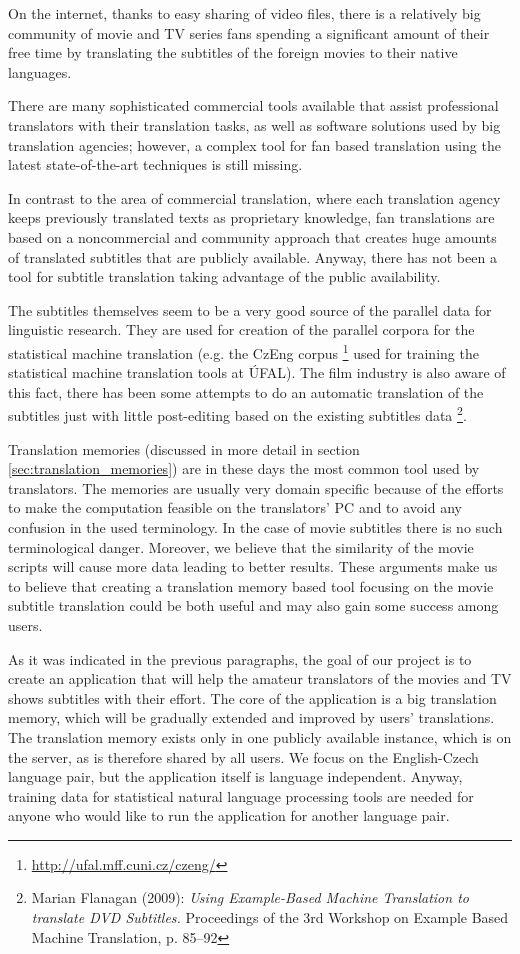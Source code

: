On the internet, thanks to easy sharing of video files, there is a relatively big community of movie and TV series fans spending a significant amount of their free time by translating the subtitles of the foreign movies to their native languages. 


There are many sophisticated commercial tools available that assist professional translators with their translation tasks, as well as software solutions used by big translation agencies; however, a complex tool for fan based translation using the latest state-of-the-art techniques is still missing. 

In contrast to the area of commercial translation, where each translation agency keeps previously translated texts as proprietary knowledge, fan translations are based on a noncommercial and  community approach that creates huge amounts of translated subtitles that are publicly available. Anyway, there has not been a tool for subtitle translation taking advantage of the public availability.

The subtitles themselves seem to be a very good source of the parallel data for linguistic research. They are used for creation of the parallel corpora for the statistical machine translation (e.g. the CzEng corpus \footnote{\url{http://ufal.mff.cuni.cz/czeng/}} used for training the statistical machine translation tools at ÚFAL). The film industry is also aware of this fact, there has been some attempts to do an automatic translation of the subtitles just with little post-editing based on the existing subtitles data \footnote{Marian Flanagan (2009): \emph{Using Example-Based Machine Translation to translate DVD Subtitles.} Proceedings of the 3rd Workshop on Example Based Machine Translation, p. 85–92}.

Translation memories (discussed in more detail in section \ref{sec:translation_memories}) are in these days the most common tool used by translators. The memories are usually very domain specific because of the efforts to make the computation feasible on the translators' PC and to avoid any confusion in the used terminology. In the case of movie subtitles there is no such terminological danger. Moreover, we believe that the similarity of the movie scripts will cause more data leading to better results. These arguments make us to believe that creating a translation memory based tool focusing on the movie subtitle translation could be both useful and may also gain some success among users.

As it was indicated in the previous paragraphs, the goal of our project is to create an application that will help the amateur translators of the movies and TV shows subtitles with their effort. The core of the application is a big translation memory, which will be gradually extended and improved by users' translations. The translation memory exists only in one publicly available instance, which is on the server, as is therefore shared by all users. We focus on the English-Czech language pair, but the application itself is language independent. Anyway, training data for statistical natural language processing tools are needed for anyone who would like to run the application for another language pair.

